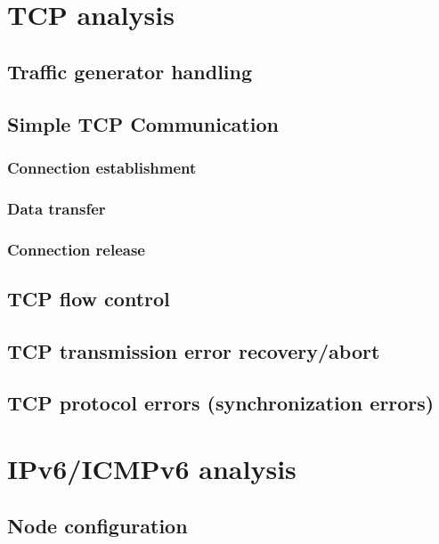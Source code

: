 \chapter{TCP analysis}
\label{tcp}
\section{Traffic generator handling}

\section{Simple TCP Communication}
\subsection{Connection establishment}
\subsection{Data transfer}
\subsection{Connection release}

\section{TCP flow control}

\section{TCP transmission error recovery/abort}

\section{TCP protocol errors (synchronization errors)}

\chapter{IPv6/ICMPv6 analysis}
\label{ipv6}
\section{Node configuration}
